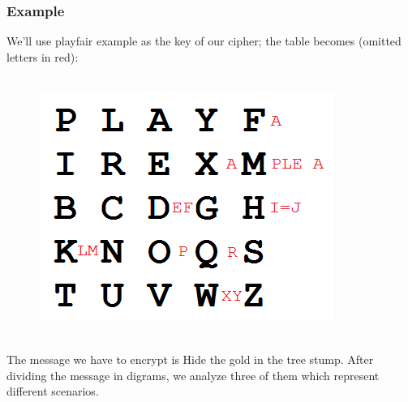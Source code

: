 \documentclass[Lau,binding=0.6cm,oneside]{sapthesis}
\begin{document}
\subsubsection{Example}
We'll use \textsf{playfair example} as the key of our cipher; the table becomes (omitted letters in red):\\\\
\begin{figure}[H]
\includegraphics[scale=0.8]{playfair_example}
\centering
\caption{}
\centering
\end{figure}
\ \\
The message we have to encrypt is \textsf{Hide the gold in the tree stump}. After dividing the message in digrams, we analyze three of them which represent different scenarios.\\\\
\end{document}
